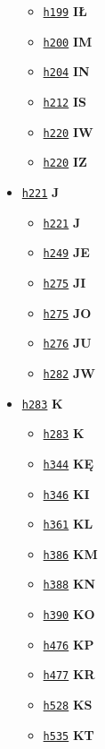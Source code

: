 \documentclass[12]{mwart}
\begin{document}
\begin{itemize}
\begin{itemize}
  \item \href{\paii{2}{207}}{\texttt{h199}}  \textbf{IŁ}
  \item \href{\paii{2}{208}}{\texttt{h200}}  \textbf{IM}
  \item \href{\paii{2}{212}}{\texttt{h204}}  \textbf{IN}
  \item \href{\paii{2}{220}}{\texttt{h212}}  \textbf{IS}
  \item \href{\paii{2}{228}}{\texttt{h220}}  \textbf{IW}
  \item \href{\paii{2}{228}}{\texttt{h220}}  \textbf{IZ}
  \end{itemize}
\item \href{\paii{2}{229}}{\texttt{h221}}  \textbf{J}
  \begin{itemize}
  \item \href{\paii{2}{229}}{\texttt{h221}}  \textbf{J}
  \item \href{\paii{2}{257}}{\texttt{h249}}  \textbf{JE}
  \item \href{\paii{2}{283}}{\texttt{h275}}  \textbf{JI}
  \item \href{\paii{2}{283}}{\texttt{h275}}  \textbf{JO}
  \item \href{\paii{2}{284}}{\texttt{h276}}  \textbf{JU}
  \item \href{\paii{2}{290}}{\texttt{h282}}  \textbf{JW}
  \end{itemize}
\item \href{\paii{2}{291}}{\texttt{h283}}  \textbf{K}
  \begin{itemize}
  \item \href{\paii{2}{291}}{\texttt{h283}}  \textbf{K}
  \item \href{\paii{2}{352}}{\texttt{h344}}  \textbf{KĘ}
  \item \href{\paii{2}{354}}{\texttt{h346}}  \textbf{KI}
  \item \href{\paii{2}{369}}{\texttt{h361}}  \textbf{KL}
  \item \href{\paii{2}{394}}{\texttt{h386}}  \textbf{KM}
  \item \href{\paii{2}{396}}{\texttt{h388}}  \textbf{KN}
  \item \href{\paii{2}{398}}{\texttt{h390}}  \textbf{KO}
  \item \href{\paii{2}{484}}{\texttt{h476}}  \textbf{KP}
  \item \href{\paii{2}{485}}{\texttt{h477}}  \textbf{KR}
  \item \href{\paii{2}{536}}{\texttt{h528}}  \textbf{KS}
  \item \href{\paii{2}{543}}{\texttt{h535}}  \textbf{KT}

\end{itemize}
\end{itemize}
\end{document}
